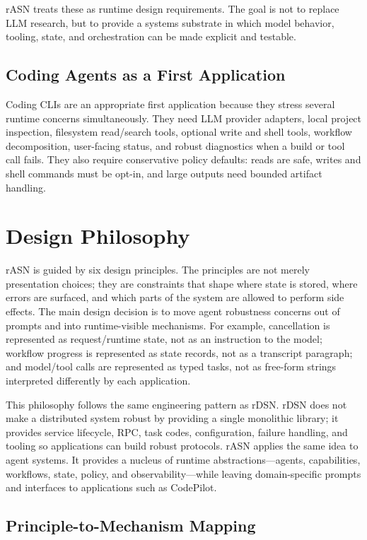 \documentclass[manuscript,screen,review]{acmart}
\newcommand{\rasn}{rASN\xspace}
\newcommand{\rdsn}{rDSN\xspace}
\newcommand{\codepilot}{CodePilot\xspace}
\begin{document}
\rasn treats these as runtime design requirements. The goal is not to replace
LLM research, but to provide a systems substrate in which model behavior,
tooling, state, and orchestration can be made explicit and testable.

\subsection{Coding Agents as a First Application}

Coding CLIs are an appropriate first application because they stress several
runtime concerns simultaneously. They need LLM provider adapters, local project
inspection, filesystem read/search tools, optional write and shell tools,
workflow decomposition, user-facing status, and robust diagnostics when a build
or tool call fails. They also require conservative policy defaults: reads are
safe, writes and shell commands must be opt-in, and large outputs need
bounded artifact handling.

\section{Design Philosophy}

\rasn is guided by six design principles.
The principles are not merely presentation choices; they are constraints that
shape where state is stored, where errors are surfaced, and which parts of the
system are allowed to perform side effects. The main design decision is to move
agent robustness concerns out of prompts and into runtime-visible mechanisms.
For example, cancellation is represented as request/runtime state, not as an
instruction to the model; workflow progress is represented as state records, not
as a transcript paragraph; and model/tool calls are represented as typed tasks,
not as free-form strings interpreted differently by each application.

This philosophy follows the same engineering pattern as \rdsn. \rdsn does not
make a distributed system robust by providing a single monolithic library; it
provides service lifecycle, RPC, task codes, configuration, failure handling,
and tooling so applications can build robust protocols. \rasn applies the same
idea to agent systems. It provides a nucleus of runtime abstractions---agents,
capabilities, workflows, state, policy, and observability---while leaving
domain-specific prompts and interfaces to applications such as \codepilot.

\subsection{Principle-to-Mechanism Mapping}
\end{document}
